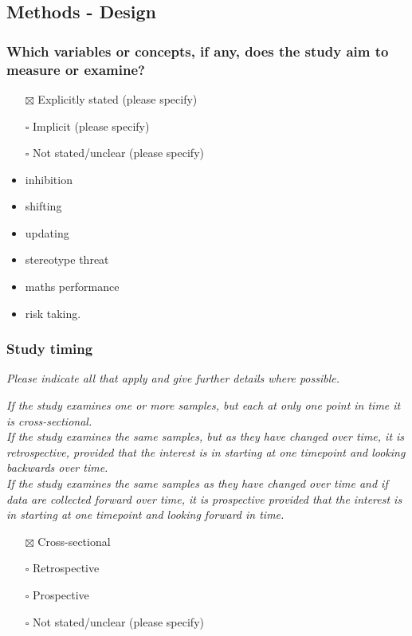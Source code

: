 \documentclass[
  doc, a4paper]{apa7}
\providecommand{\tightlist}{%
  \setlength{\itemsep}{0pt}\setlength{\parskip}{0pt}}
\begin{document}
\subsection{Methods - Design}\label{methods---design}

\subsubsection{Which variables or concepts, if any, does the study aim to measure or examine?}\label{which-variables-or-concepts-if-any-does-the-study-aim-to-measure-or-examine}

\begin{itemize}
\item[$\boxtimes$]
  Explicitly stated (please specify)\\
\item[$\square$]
  Implicit (please specify)\\
\item[$\square$]
  Not stated/unclear (please specify)
\item
  inhibition
\item
  shifting
\item
  updating
\item
  stereotype threat
\item
  maths performance
\item
  risk taking.
\end{itemize}

\subsubsection{Study timing}\label{study-timing}

\emph{Please indicate all that apply and give further details where possible.}

\emph{If the study examines one or more samples, but each at only one point in time it is cross-sectional.}\\
\emph{If the study examines the same samples, but as they have changed over time, it is retrospective, provided that the interest is in starting at one timepoint and looking backwards over time.}\\
\emph{If the study examines the same samples as they have changed over time and if data are collected forward over time, it is prospective provided that the interest is in starting at one timepoint and looking forward in time.}

\begin{itemize}
\tightlist
\item[$\boxtimes$]
  Cross-sectional\\
\item[$\square$]
  Retrospective\\
\item[$\square$]
  Prospective\\
\item[$\square$]
  Not stated/unclear (please specify)
\end{itemize}
\end{document}
